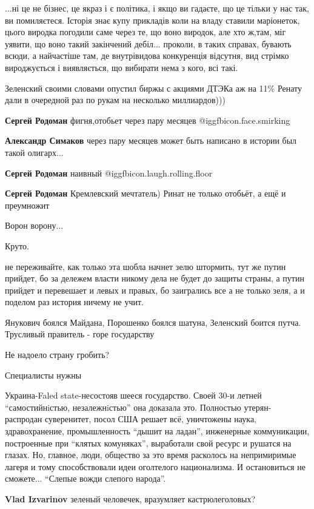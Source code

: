 \begin{itemize}

...ні це не бізнес, це якраз і є політика, і якщо ви гадаєте, що це тільки у
нас так, ви помиляєтеся. Історія знає купу прикладів коли на владу ставили
маріонеток, цього виродка погодили саме через те, що воно виродок, але хто
ж,там, міг уявити, що воно такий закінчений дебіл... проколи, в таких справах,
бувають всюди, а найчастіше там, де внутрівидова конкуренція відсутня, вид
стрімко вироджується і виявляється, що вибирати нема з кого, всі такі.


Зеленский своими словами опустил биржы с акциями ДТЭКа аж на 11\% Ренату дали в
очередной раз по рукам на несколько миллиардов)))

\begin{itemize} %
\textbf{Сергей Родоман} фигня,отобьет через пару месяцев @igg{fbicon.face.smirking} 

\textbf{Александр Симаков} через пару месяцев может быть написано в истории был такой олигарх...

\textbf{Сергей Родоман} наивный  @igg{fbicon.laugh.rolling.floor} 

\textbf{Сергей Родоман} Кремлевский мечтатель) Ринат не только отобьёт, а ещё и преумножит
\end{itemize} %

Ворон ворону...

Круто.


не переживайте, как только эта шобла начнет зелю штормить, тут же путин
прийдет, бо за дележем власти никому дела не будет до защиты страны, а путин
прийдет и перевешает и левых и правых, бо заигрались все а не только зеля, а
и поделом раз история ничему не учит.


Янукович боялся Майдана, Порошенко боялся шатуна, Зеленский боится путча.
Трусливый правитель - горе государству

Не надоело страну гробить?

Специалисты нужны


Украина-Faled state-несостояв шееся государство. Своей 30-и летней
\enquote{самостийнiстью, незалежнiстью} она доказала это. Полностью утерян-
распродан суверенитет, посол США решает всё, уничтожены наука, здравохранение,
промышленность \enquote{дышит на ладан}, инженерные коммуникации, построенные
при \enquote{клятых комуняках}, выработали свой ресурс и рушатся на глазах.
Но, главное, люди, общество за это время расколось на непримиримые лагеря и
тому способствовали идеи оголтелого национализма.  И остановиться не сможете...
\enquote{Слепые вожди слепого народа}.

\textbf{Vlad Izvarinov} зеленый человечек, вразумляет кастрюлеголовых?



\end{itemize} %

